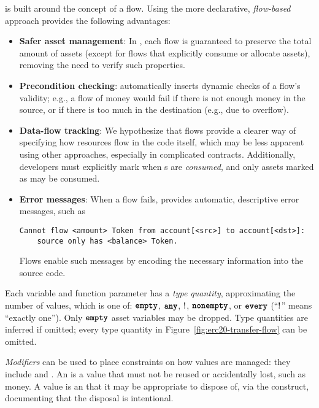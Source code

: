 \documentclass[dvipsnames,runningheads]{llncs}
\begin{document}
\langName is built around the concept of a flow.
Using the more declarative, \emph{flow-based} approach provides the following advantages:
\begin{itemize}
    \item \textbf{Safer asset management}: In \langName, each flow is guaranteed to preserve the total amount of assets (except for flows that explicitly consume or allocate assets), removing the need to verify such properties.
    \item \textbf{Precondition checking}: \langName automatically inserts dynamic checks of a flow's validity; e.g., a flow of money would fail if there is not enough money in the source, or if there is too much in the destination (e.g., due to overflow).
    \item \textbf{Data-flow tracking}: We hypothesize that flows provide a clearer way of specifying how resources flow in the code itself, which may be less apparent using other approaches, especially in complicated contracts.
        Additionally, developers must explicitly mark when \assetTxt{}s are \emph{consumed}, and only assets marked as  may be consumed.
    \item \textbf{Error messages}: When a flow fails, \langName provides automatic, descriptive error messages, such as
\begin{lstlisting}[numbers=none, basicstyle=\small\ttfamily, xleftmargin=-5.0ex]
Cannot flow <amount> Token from account[<src>] to account[<dst>]:
    source only has <balance> Token.
\end{lstlisting}
        Flows enable such messages by encoding the necessary information into the source code.
\end{itemize}

Each variable and function parameter has a \emph{type quantity}, approximating the number of values, which is one of: $\textbf{\texttt{empty}}$, $\textbf{\texttt{any}}$, $!$, $\textbf{\texttt{nonempty}}$, or $\textbf{\texttt{every}}$ (``$!$'' means ``exactly one'').
Only $\textbf{\texttt{empty}}$ asset variables may be dropped.
Type quantities are inferred if omitted; every type quantity in Figure~\ref{fig:erc20-transfer-flow} can be omitted.

\emph{Modifiers} can be used to place constraints on how values are managed: they include  and .
An  is a value that must not be reused or accidentally lost, such as money.
A  value is an  that it may be appropriate to dispose of, via the  construct, documenting that the disposal is intentional.
\end{document}
